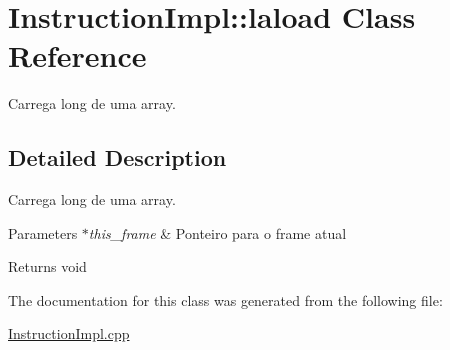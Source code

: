 \hypertarget{class_instruction_impl_1_1laload}{}\section{Instruction\+Impl\+:\+:laload Class Reference}
\label{class_instruction_impl_1_1laload}


Carrega long de uma array.  




\subsection{Detailed Description}
Carrega long de uma array. 


\begin{DoxyParams}{Parameters}
{\em $\ast$this\+\_\+frame} & Ponteiro para o frame atual \\
\hline
\end{DoxyParams}
\begin{DoxyReturn}{Returns}
void 
\end{DoxyReturn}


The documentation for this class was generated from the following file\+:\begin{DoxyCompactItemize}
\item 
\hyperlink{_instruction_impl_8cpp}{Instruction\+Impl.\+cpp}\end{DoxyCompactItemize}
